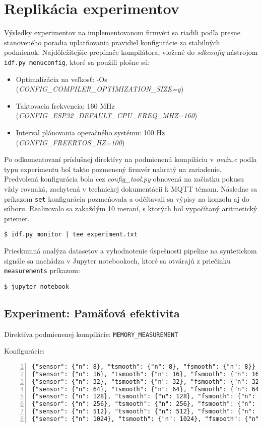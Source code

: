 \section{Replikácia experimentov}
Výsledky experimentov na implementovanom firmvéri sa riadili podľa presne stanoveného poradia
uplatňovania pravidiel konfigurácie za stabilných podmienok. Najdôležitejšie
prepínače kompilátora, vložené do \emph{sdkconfig} nástrojom \verb|idf.py menuconfig|, ktoré 
sa použili plošne sú:
\begin{itemize}[noitemsep,topsep=0pt]
    \item Optimalizácia na veľkosť: -Os \\(\emph{CONFIG\_COMPILER\_OPTIMIZATION\_SIZE=y})
   	\item Taktovacia frekvencia: 160 MHz  \\ (\emph{CONFIG\_ESP32\_DEFAULT\_CPU\_FREQ\_MHZ=160})
    \item Interval plánovania operačného systému: 100 Hz\\  (\emph{CONFIG\_FREERTOS\_HZ=100})
\end{itemize}
    
Po odkomentovaní príslušnej direktívy na podmienenú kompiláciu v \emph{main.c} podľa typu experimentu
bol takto pozmenený firmvér nahratý na zariadenie. Predvolená konfigurácia bola
cez \emph{config\_tool.py} obnovená na začiatku pokusu vždy rovnaká, zachytená v technickej dokumentácii
k MQTT témam. Následne sa príkazom \verb|set| konfigurácia pozmeňovala a odčítavali
sa výpisy na konzolu aj do súboru. Realizovalo sa zakaždým 10 meraní, s ktorých bol vypočítaný aritmetický priemer.
\begin{lstlisting}[style=messages]
$ idf.py monitor | tee experiment.txt
\end{lstlisting}
\bigbreak

Prieskumná analýza datasetov a vyhodnotenie úspešnosti pipeline na syntetickom signále
sa nachádza v Jupyter notebookoch, ktoré sa otvárajú z priečinku \verb|measurements| príkazom:
\begin{lstlisting}[style=messages]
$ jupyter notebook
\end{lstlisting}


\subsection*{Experiment: Pamäťová efektivita}
Direktíva podmienenej kompilácie: \verb|MEMORY_MEASUREMENT|

Konfigurácie:
\begin{lstlisting}[style=messages, numbers=left, numberstyle=\tiny]
{"sensor": {"n": 8}, "tsmooth": {"n": 8}, "fsmooth": {"n": 8}}
{"sensor": {"n": 16}, "tsmooth": {"n": 16}, "fsmooth": {"n": 16}}
{"sensor": {"n": 32}, "tsmooth": {"n": 32}, "fsmooth": {"n": 32}}
{"sensor": {"n": 64}, "tsmooth": {"n": 64}, "fsmooth": {"n": 64}}
{"sensor": {"n": 128}, "tsmooth": {"n": 128}, "fsmooth": {"n": 128}}
{"sensor": {"n": 256}, "tsmooth": {"n": 256}, "fsmooth": {"n": 256}}
{"sensor": {"n": 512}, "tsmooth": {"n": 512}, "fsmooth": {"n": 512}}
{"sensor": {"n": 1024}, "tsmooth": {"n": 1024}, "fsmooth": {"n": 1024}}
\end{lstlisting}

